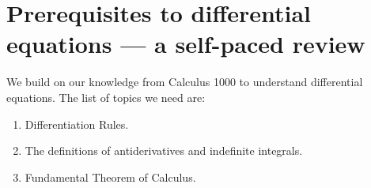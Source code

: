\documentclass[../main.tex]{subfiles}
\begin{document}
 \section{Prerequisites to differential equations --- a self-paced review}
We build on our knowledge from Calculus 1000 to understand differential equations.   The list of topics we need are:
\begin{enumerate}
  \item Differentiation Rules.
  \item The definitions of antiderivatives and indefinite integrals.
  \item Fundamental Theorem of Calculus.
\end{enumerate}

\begin{example}
  
\end{example}
\end{document}

